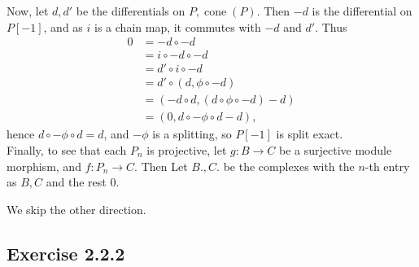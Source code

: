 \documentclass{article}
\theoremstyle{definition}
\DeclareMathOperator{\cone}{cone}
\begin{document}
Now, let $d, d'$ be the differentials on $P, \cone(P)$. Then $-d$ is the differential 
on $P[-1]$, and as $i$ is a chain map, it commutes with $-d$ and $d'$. Thus
\begin{align*}
	0
	&=
	-d \circ -d \\
	&=
	i \circ -d \circ -d \\
	&=
	d' \circ i \circ -d \\
	&=
	d' \circ (d, \phi \circ -d) \\
	&=
	(-d \circ d, (d \circ \phi \circ - d) - d) \\
	&=
	(0, d \circ -\phi \circ d - d),
\end{align*}
hence $d \circ -\phi \circ d = d$, and $-\phi$ is a splitting, so $P[-1]$ is split exact. \\

Finally, to see that each $P_n$ is projective, let $g : B \to C$ be a
surjective module morphism, and $f : P_n \to C$. Then Let $B., C.$ be the
complexes with the $n$-th entry as $B, C$ and the rest $0$.

We skip the other direction.

\subsection*{Exercise 2.2.2}
\end{document}
